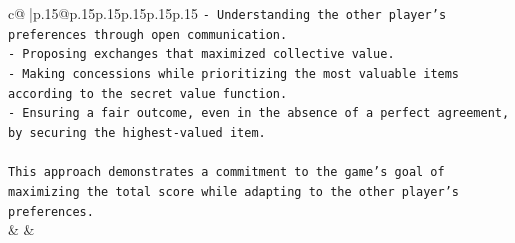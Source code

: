 \documentclass{article}
\begin{document}
{\begin{supertabular}{c@{$\;$}|p{.15\linewidth}@{}p{.15\linewidth}p{.15\linewidth}p{.15\linewidth}p{.15\linewidth}p{.15\linewidth}}
{{{\texttt{{-} Understanding the other player's preferences through open communication.} \\
\texttt{{-} Proposing exchanges that maximized collective value.} \\
\texttt{{-} Making concessions while prioritizing the most valuable items according to the secret value function.} \\
\texttt{{-} Ensuring a fair outcome, even in the absence of a perfect agreement, by securing the highest{-}valued item.} \\
\\ 
\texttt{This approach demonstrates a commitment to the game's goal of maximizing the total score while adapting to the other player's preferences.} \\
            }
        }
    }
    & & \\ \\


\end{supertabular}}
\end{document}
